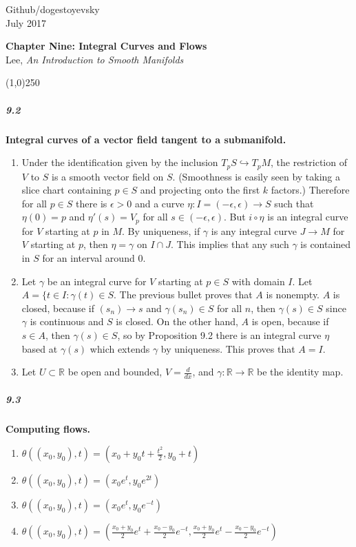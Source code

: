 \documentclass[10pt,letter]{article}
\begin{document}
\noindent Github/dogestoyevsky \\
July 2017
\begin{center}
\textbf{Chapter Nine: Integral Curves and Flows}\\ Lee, \textit{An Introduction to Smooth Manifolds}

\line(1,0){250}
\end{center}

\subparagraph{9.2} {\bf Integral curves of a vector field tangent to a submanifold.} 
\begin{enumerate}[label=(\alph*)]
\item Under the identification given by the inclusion $T_pS \hookrightarrow T_pM$, the restriction of $V$ to $S$ is a smooth vector field on $S$. (Smoothness is easily seen by taking a slice chart containing $p \in S$ and projecting onto the first $k$ factors.)  Therefore for all $p \in S$ there is $\epsilon > 0$ and a curve $\eta: I = (-\epsilon,\epsilon) \rightarrow S$ such that $\eta(0) = p$ and $\eta'(s) = V_p$ for all $s \in (-\epsilon,\epsilon)$. But $i \circ \eta$ is an integral curve for $V$ starting at $p$ in $M$. By uniqueness, if $\gamma$ is any integral curve $J \rightarrow M$ for $V$ starting at $p$, then $\eta = \gamma$ on $I \cap J$. This implies that any such $\gamma$ is contained in $S$ for an interval around $0$. 
\item Let $\gamma$ be an integral curve for $V$ starting at $p \in S$ with domain $I$. Let $A = \lbrace t \in I: \gamma(t) \in S$. The previous bullet proves that $A$ is nonempty. $A$ is closed, because if $(s_n) \rightarrow s$ and $\gamma(s_n) \in S$ for all $n$, then $\gamma(s) \in S$ since $\gamma$ is continuous and $S$ is closed. On the other hand, $A$ is open, because if $s \in A$, then $\gamma(s) \in S$, so by Proposition 9.2 there is an integral curve $\eta$ based at $\gamma(s)$ which extends $\gamma$ by uniqueness. This proves that $A = I$. 
\item Let $U \subset \mathbb{R}$ be open and bounded, $V = \frac{d}{dx}$, and $\gamma: \mathbb{R} \rightarrow\mathbb{R}$ be the identity map.  
\end{enumerate}

\subparagraph{9.3} {\bf Computing flows.} 
\begin{enumerate}[label=(\alph*)]
\item $\theta((x_0,y_0),t) = (x_0 + y_0t + \frac{t^2}{2},y_0+t)$
\item $\theta((x_0,y_0),t) = (x_0e^t,y_0e^{2t})$
\item $\theta((x_0,y_0),t) = (x_0e^t,y_0e^{-t})$
\item $\theta((x_0,y_0),t) = (\frac{x_0+y_0}{2}e^t+\frac{x_0-y_0}{2}e^{-t},\frac{x_0+y_0}{2}e^t-\frac{x_0-y_0}{2}e^{-t})$
\end{enumerate}
\end{document}
